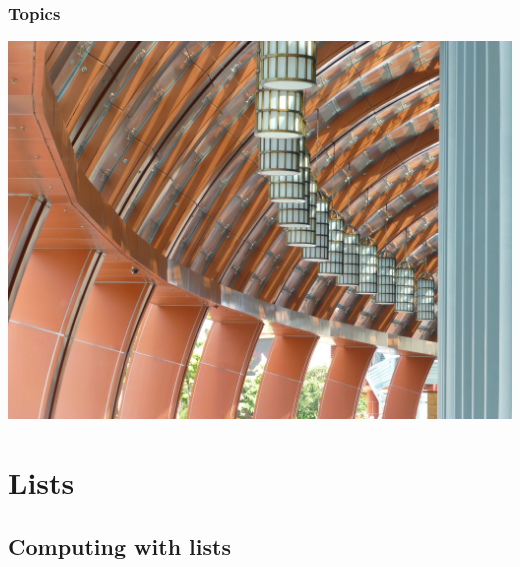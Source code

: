 \documentclass{beamer}
\begin{document}
\begin{frame}[fragile]
  \PresentationTitleSlide
\end{frame}

\begin{frame}[fragile]
  \frametitle{Topics}
  \tableofcontents
\end{frame}


\begin{frame}[fragile]
\begin{center}
\includegraphics[scale=0.35]
    {figures/jpg/pic04.jpg}
\end{center}
\end{frame}
\section{Lists}
\subsection{Computing with lists}
\end{document}
